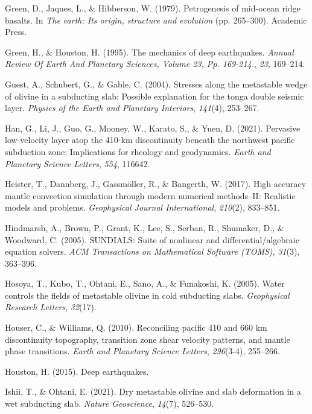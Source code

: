 \documentclass[
  paper=a4,
  ,captions=tableheading
]{scrartcl}
\newlength{\cslhangindent}
\newenvironment{CSLReferences}[2] %
  {\begin{list}{}{%
   \setlength{\itemindent}{0pt}
   \setlength{\leftmargin}{0pt}
   \setlength{\parsep}{0pt}
   \ifodd #1
    \setlength{\leftmargin}{\cslhangindent}
    \setlength{\itemindent}{-1\cslhangindent}
   \fi
   \setlength{\itemsep}{#2\baselineskip}}}
  {\end{list}}
\begin{document}
\begin{CSLReferences}{1}{0}
Green, D., Jaques, L., \& Hibberson, W. (1979). Petrogenesis of
mid-ocean ridge basalts. In \emph{The earth: Its origin, structure and
evolution} (pp. 265--300). Academic Press.

Green, H., \& Houston, H. (1995). The mechanics of deep earthquakes.
\emph{Annual Review Of Earth And Planetary Sciences, Volume 23, Pp.
169-214.}, \emph{23}, 169--214.

Guest, A., Schubert, G., \& Gable, C. (2004). Stresses along the
metastable wedge of olivine in a subducting slab: Possible explanation
for the tonga double seismic layer. \emph{Physics of the Earth and
Planetary Interiors}, \emph{141}(4), 253--267.

Han, G., Li, J., Guo, G., Mooney, W., Karato, S., \& Yuen, D. (2021).
Pervasive low-velocity layer atop the 410-km discontinuity beneath the
northwest pacific subduction zone: Implications for rheology and
geodynamics. \emph{Earth and Planetary Science Letters}, \emph{554},
116642.

Heister, T., Dannberg, J., Gassmöller, R., \& Bangerth, W. (2017). High
accuracy mantle convection simulation through modern numerical
methods--II: Realistic models and problems. \emph{Geophysical Journal
International}, \emph{210}(2), 833--851.

Hindmarsh, A., Brown, P., Grant, K., Lee, S., Serban, R., Shumaker, D.,
\& Woodward, C. (2005). SUNDIALS: Suite of nonlinear and
differential/algebraic equation solvers. \emph{ACM Transactions on
Mathematical Software (TOMS)}, \emph{31}(3), 363--396.

Hosoya, T., Kubo, T., Ohtani, E., Sano, A., \& Funakoshi, K. (2005).
Water controls the fields of metastable olivine in cold subducting
slabs. \emph{Geophysical Research Letters}, \emph{32}(17).

Houser, C., \& Williams, Q. (2010). Reconciling pacific 410 and 660 km
discontinuity topography, transition zone shear velocity patterns, and
mantle phase transitions. \emph{Earth and Planetary Science Letters},
\emph{296}(3-4), 255--266.

Houston, H. (2015). Deep earthquakes.

Ishii, T., \& Ohtani, E. (2021). Dry metastable olivine and slab
deformation in a wet subducting slab. \emph{Nature Geoscience},
\emph{14}(7), 526--530.


\end{CSLReferences}
\end{document}
